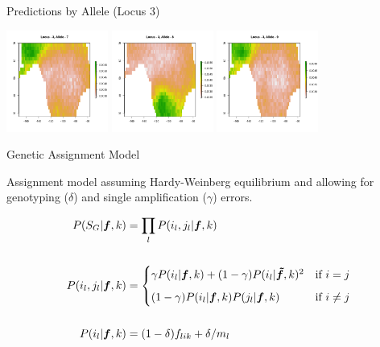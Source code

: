 \documentclass[11pt,ignorenonframetext,]{beamer}
\begin{document}
\begin{frame}{Predictions by Allele (Locus 3)}
\begin{center}
\includegraphics[width=0.25\textwidth]{figs/allele3/Med-Al3-7.png}
\includegraphics[width=0.25\textwidth]{figs/allele3/Med-Al3-8.png}
\includegraphics[width=0.25\textwidth]{figs/allele3/Med-Al3-9.png}
\end{center}

\end{frame}

\begin{frame}{Genetic Assignment Model}

Assignment model assuming Hardy-Weinberg equilibrium and allowing for
genotyping (\(\delta\)) and single amplification (\(\gamma\)) errors.

\[
\begin{aligned}
P(S_G|\bm{f},k) &= \prod_l P(i_l, j_l | \bm{f},k) \\
\\
P(i_l, j_l | \bm{f},k) &= 
\begin{cases}
\gamma P(i_l|\bm{f},k) + (1-\gamma)P(i_l|\bm{\tilde f},k)^2 & \text{if $i=j$} \vspace{2mm} \\
(1-\gamma) P(i_l|\bm{f},k) P(j_l|\bm{f},k)      & \text{if $i \ne j$}
\end{cases} \\
\\
P(i_l|\bm{f},k) &= (1-\delta) f_{lik} + \delta / m_l
\end{aligned}
\]

\end{frame}
\end{document}
